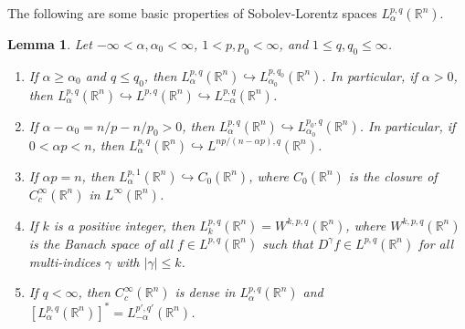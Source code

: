 \documentclass[reqno,centertags,11pt]{amsart}
\newtheorem{lem}[thm]{Lemma}
\theoremstyle{definition}
\numberwithin{thm}{section}
\numberwithin{equation}{section}
\newcommand{\R}{{\mathbb{R}}}
\begin{document}
\medskip
The following are some basic properties of  Sobolev-Lorentz spaces $L_\alpha^{p,q}(\R^n)$.

\begin{lem}\label{properties of SL on Rn} Let $ -\infty<  \alpha, \alpha_0 < \infty$,  $1< p , p_0< \infty$, and    $1 \le q, q_0 \le \infty$.
\begin{enumerate}[{\upshape (i)}]
\item  If $\alpha  \ge \alpha_0$  and $q \le q_0 $, then   $L_\alpha^{p,q}(\R^n ) \hookrightarrow L_{\alpha_0}^{p,q_0 }(\R^n )  $. In particular, if $\alpha > 0$, then $L_\alpha^{p,q}(\R^n ) \hookrightarrow L^{p,q  }(\R^n )\hookrightarrow L_{-\alpha}^{p,q}(\R^n )$.
\item  If $\alpha-\alpha_0 = n/p-n/p_0 >0$, then $L_\alpha^{p,q}(\R^n)\hookrightarrow L_{\alpha_0}^{p_0 , q}(\R^n)$. In particular, if $0<  \alpha p < n $, then $L_\alpha^{p,q}(\R^n)\hookrightarrow L^{np/(n-\alpha p),q}(\R^n)$.
\item   If $\alpha p=n$, then $L_\alpha^{p,1}(\R^n)\hookrightarrow C_0 (\R^n )$, where $C_0 (\R^n )$ is the closure of $C_c^\infty (\R^n)$ in $L^\infty (\R^n )$.
\item   If $k$ is a positive integer, then $L_k^{p,q}(\R^n) =W^{k,p,q}(\R^n )$, where $W^{k,p,q}(\R^n )$ is the Banach space  of  all $f \in L^{p,q}(\R^n )$ such that $D^\gamma f \in L^{p,q}(\R^n )$ for all multi-indices $\gamma$ with $|\gamma | \le k$.
\item  If $q < \infty$, then $C_c^\infty (\R^n)$ is dense in  $L_\alpha^{p,q}(\R^n)$ and $\left[L_\alpha^{p,q}(\R^n) \right]^* = L_{-\alpha}^{p',q'}(\R^n)$.
\end{enumerate}
\end{lem}
\end{document}
